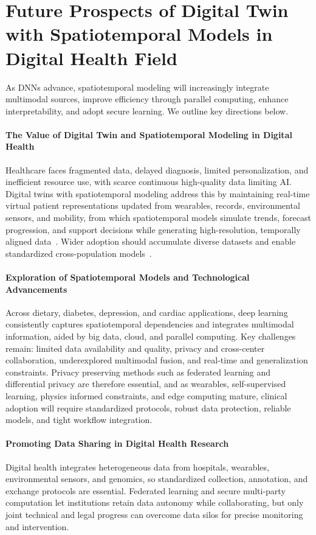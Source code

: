 \documentclass[journal]{IEEEtran}
\begin{document}
\section{Future Prospects of Digital Twin with Spatiotemporal Models in Digital Health Field}
\label{sec:future}
As DNNs advance, spatiotemporal modeling will increasingly integrate multimodal sources, improve efficiency through parallel computing, enhance interpretability, and adopt secure learning. We outline key directions below.
\paragraph{The Value of Digital Twin and Spatiotemporal Modeling in Digital Health}

Healthcare faces fragmented data, delayed diagnosis, limited personalization, and inefficient resource use, with scarce continuous high-quality data limiting AI. Digital twins with spatiotemporal modeling address this by maintaining real-time virtual patient representations updated from wearables, records, environmental sensors, and mobility, from which spatiotemporal models simulate trends, forecast progression, and support decisions while generating high-resolution, temporally aligned data~\cite{ali2024spatialtwins}. Wider adoption should accumulate diverse datasets and enable standardized cross-population models~\cite{bilal2025cityseircast}.

\paragraph{Exploration of Spatiotemporal Models and Technological Advancements}

Across dietary, diabetes, depression, and cardiac applications, deep learning consistently captures spatiotemporal dependencies and integrates multimodal information, aided by big data, cloud, and parallel computing. Key challenges remain: limited data availability and quality, privacy and cross-center collaboration, underexplored multimodal fusion, and real-time and generalization constraints. Privacy preserving methods such as federated learning and differential privacy are therefore essential, and as wearables, self-supervised learning, physics informed constraints, and edge computing mature, clinical adoption will require standardized protocols, robust data protection, reliable models, and tight workflow integration.
\paragraph{Promoting Data Sharing in Digital Health Research}
Digital health integrates heterogeneous data from hospitals, wearables, environmental sensors, and genomics, so standardized collection, annotation, and exchange protocols are essential. Federated learning and secure multi-party computation let institutions retain data autonomy while collaborating, but only joint technical and legal progress can overcome data silos for precise monitoring and intervention.
\end{document}
